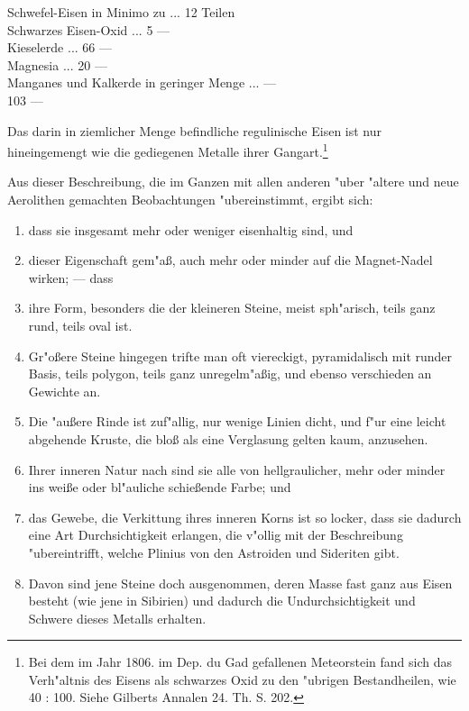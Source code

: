 \documentclass[a4paper, 11pt, oneside, polutonikogreek, german]{article}
\begin{document}
Schwefel-Eisen in Minimo zu ... 12 Teilen\\
\hspace*{0.5cm} Schwarzes Eisen-Oxid ... 5 ---\\
\hspace*{0.5cm} Kieselerde ... 66 ---\\
\hspace*{0.5cm} Magnesia ... 20 ---\\
\hspace*{0.5cm} Manganes und Kalkerde in geringer Menge ... ---\\
\hspace*{2.5cm} 103 ---

Das darin in ziemlicher Menge befindliche regulinische Eisen ist nur hineingemengt wie die gediegenen Metalle ihrer Gangart.\footnote{Bei dem im Jahr 1806. im Dep. du Gad gefallenen Meteorstein fand sich das Verh"altnis des Eisens als schwarzes Oxid zu den "ubrigen Bestandheilen, wie 40 : 100. Siehe Gilberts Annalen 24. Th. S. 202.}

Aus dieser Beschreibung, die im Ganzen mit allen anderen "uber "altere und neue Aerolithen gemachten Beobachtungen "ubereinstimmt, ergibt sich:
\begin{enumerate}
    \item dass sie insgesamt mehr oder weniger eisenhaltig sind, und
    \item dieser Eigenschaft gem"aß, auch mehr oder minder auf die Magnet-Nadel wirken; --- dass
    \item ihre Form, besonders die der kleineren Steine, meist sph"arisch, teils ganz rund, teils oval ist.
    \item Gr"oßere Steine hingegen trifte man oft viereckigt, pyramidalisch mit runder Basis, teils polygon, teils ganz unregelm"aßig, und ebenso verschieden an Gewichte an.
    \item Die "außere Rinde ist zuf"allig, nur wenige Linien dicht, und f"ur eine leicht abgehende Kruste, die bloß als eine Verglasung gelten kaum, anzusehen.
    \item Ihrer inneren Natur nach sind sie alle von hellgraulicher, mehr oder minder ins weiße oder bl"auliche schießende Farbe; und
    \item das Gewebe, die Verkittung ihres inneren Korns ist so locker, dass sie dadurch eine Art Durchsichtigkeit erlangen, die v"ollig mit der Beschreibung "ubereintrifft, welche Plinius von den Astroiden und Sideriten gibt.
    \item Davon sind jene Steine doch ausgenommen, deren Masse fast ganz aus Eisen besteht (wie jene in Sibirien) und dadurch die Undurchsichtigkeit und Schwere dieses Metalls erhalten.
\end{enumerate}
\end{document}
